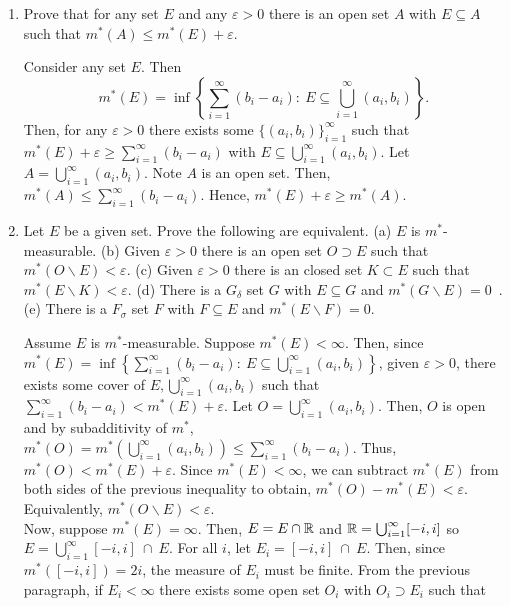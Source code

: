 \begin{enumerate}
\item Prove that for any set $E$ and any $\varepsilon > 0$ there is an open set $A$ with $E \subseteq A$ such that $m^*(A)\leq m^*(E)+\varepsilon$. 
\begin{pf}
Consider any set $E$. Then \[
m^{*}(E)=\inf \left\lbrace \sum_{i=1}^\infty (b_i - a_i) \colon \ E \subseteq \bigcup_{i=1}^\infty (a_i, b_i) \right\rbrace.
\]
Then, for any $\varepsilon>0$ there exists some $\lbrace (a_i, b_i)\rbrace _{i=1}^\infty$ such that $m^{*}(E) + \varepsilon \geq \sum_{i = 1}^\infty (b_i-a_i)$ with $E \subseteq \bigcup_{i=1}^\infty (a_i, b_i)$. Let $A=\bigcup_{i=1}^\infty (a_i, b_i)$. Note $A$ is an open set. Then, $m^{*}(A)\leq \sum_{i=1}^\infty (b_i-a_i)$. Hence, $m^{*}(E) + \varepsilon \geq m^{*}(A)$.
\end{pf}

\item Let $E$ be a given set. Prove the following are equivalent.
(a) $E$ is $m^*$-measurable. (b) Given $\varepsilon>0$ there is an open set $O \supset E$ such that $m^*(O\backslash E)<\varepsilon$. (c) Given $\varepsilon>0$ there is an closed set $K \subset E$ such that $m^*(E\backslash K)<\varepsilon$. (d) There is a $G_{\delta}$ set $G$ with $E \subseteq G$ and $m^*(G \backslash E)=0$\ . (e) There is a $F_{\sigma}$ set $F$ with $F \subseteq E$ and $m^*(E \backslash F)=0$.
\begin{pf}
Assume $E$ is $m^{*}$-measurable. Suppose $m^{*}(E)<\infty$. Then, since \\$m^{*}(E)=\inf \left\lbrace \sum_{i=1}^\infty (b_i - a_i) \colon \ E \subseteq \bigcup_{i=1}^\infty (a_i, b_i) \right\rbrace$, given $\varepsilon>0$, there exists some cover of $E, \bigcup_{i=1}^\infty (a_i, b_i)$ such that $\sum_{i=1}^\infty (b_i - a_i) < m^{*}(E) + \varepsilon$. Let $O=\bigcup_{i=1}^\infty (a_i, b_i)$. Then, $O$ is open and by subadditivity of $m^{*}$, $m^{*}(O)=m^{*}(\bigcup_{i=1}^\infty (a_i, b_i)) \leq \sum_{i=1}^\infty (b_i-a_i)$. Thus, $m^{*}(O) < m^{*}(E) + \varepsilon$. Since $m^{*}(E)<\infty$, we can subtract $m^{*}(E)$ from both sides of the previous inequality to obtain,  $m^{*}(O) - m^{*}(E) < \varepsilon$. Equivalently, $m^{*}(O \backslash E) < \varepsilon$.\\
Now, suppose $m^{*}(E)=\infty$. Then, $E=E\cap {\mathbb R}$ and ${\mathbb R}=\bigcup_{i=1}^{\infty}[-i, i]$ so $E=\bigcup_{i=1}^{\infty}[-i, i] \ \cap \ E$. For all $i$, let $E_i=[-i, i] \ \cap \ E$. Then, since $m^{*}([-i, i])=2i$, the measure of $E_i$ must be finite. From the previous paragraph, if $E_i < \infty$ there exists some open set $O_i$ with $O_i \supset E_i$ such that 

\end{pf}
\end{enumerate}
